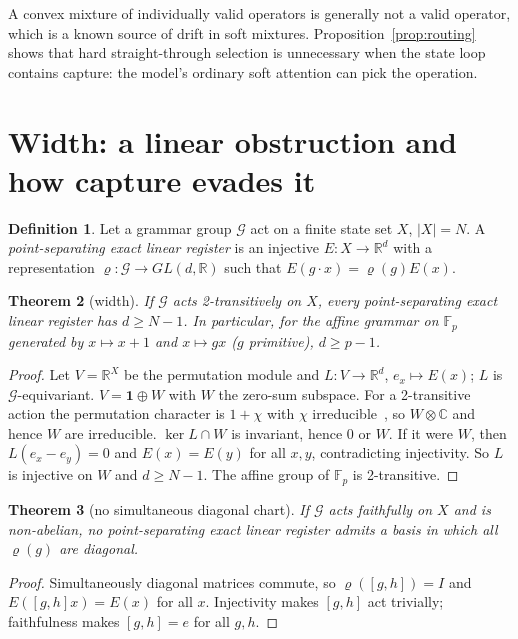 \documentclass[11pt]{article}
\newtheorem{theorem}{Theorem}
\theoremstyle{definition}
\newtheorem{definition}[theorem]{Definition}
\theoremstyle{remark}
\newcommand{\R}{\mathbb{R}}
\newcommand{\F}{\mathbb{F}}
\begin{document}
A convex mixture of individually valid operators is generally not a valid operator, which is a
known source of drift in soft mixtures. Proposition~\ref{prop:routing} shows that hard
straight-through selection is unnecessary when the state loop contains capture: the model's
ordinary soft attention can pick the operation.

\section{Width: a linear obstruction and how capture evades it}\label{sec:width}

\begin{definition}
Let a grammar group $\mathcal G$ act on a finite state set $X$, $|X|=N$. A \emph{point-separating
exact linear register} is an injective $E:X\to\R^d$ with a representation
$\varrho:\mathcal G\to GL(d,\R)$ such that $E(g\cdot x)=\varrho(g)E(x)$.
\end{definition}

\begin{theorem}[width]\label{thm:width}
If $\mathcal G$ acts 2-transitively on $X$, every point-separating exact linear register has
$d\ge N-1$. In particular, for the affine grammar on $\F_p$ generated by $x\mapsto x+1$ and
$x\mapsto gx$ ($g$ primitive), $d\ge p-1$.
\end{theorem}
\begin{proof}
Let $V=\R^X$ be the permutation module and $L:V\to\R^d$, $e_x\mapsto E(x)$; $L$ is
$\mathcal G$-equivariant. $V=\mathbf 1\oplus W$ with $W$ the zero-sum subspace. For a
2-transitive action the permutation character is $1+\chi$ with $\chi$ irreducible~\cite{serre},
so $W\otimes\mathbb C$ and hence $W$ are irreducible. $\ker L\cap W$ is invariant, hence $0$ or
$W$. If it were $W$, then $L(e_x-e_y)=0$ and $E(x)=E(y)$ for all $x,y$, contradicting injectivity.
So $L$ is injective on $W$ and $d\ge N-1$. The affine group of $\F_p$ is 2-transitive.
\end{proof}

\begin{theorem}[no simultaneous diagonal chart]\label{thm:nodiag}
If $\mathcal G$ acts faithfully on $X$ and is non-abelian, no point-separating exact linear
register admits a basis in which all $\varrho(g)$ are diagonal.
\end{theorem}
\begin{proof}
Simultaneously diagonal matrices commute, so $\varrho([g,h])=I$ and $E([g,h]x)=E(x)$ for all
$x$. Injectivity makes $[g,h]$ act trivially; faithfulness makes $[g,h]=e$ for all $g,h$.
\end{proof}
\end{document}
